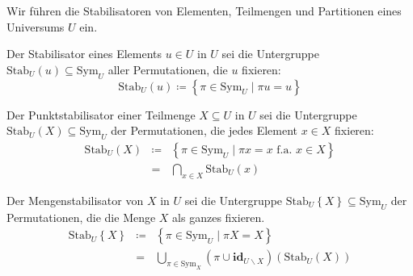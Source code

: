 Wir führen die Stabilisatoren von Elementen, Teilmengen und Partitionen
eines Universums $U$ ein.
\begin{defn}
Der Stabilisator eines Elements $u\in U$ in $U$ sei die Untergruppe
$\mathrm{Stab}_{U}\left(u\right)\subseteq\mathrm{Sym}_{U}$ aller
Permutationen, die $u$ fixieren: 
\[
\mathrm{Stab}_{U}\left(u\right)\coloneqq\left\{ \pi\in\mathrm{Sym}_{U}\mid\pi u=u\right\} 
\]

Der Punktstabilisator\textbf{ }einer Teilmenge $X\subseteq U$ in
$U$ sei die Untergruppe $\mathrm{Stab}_{U}\left(X\right)\subseteq\mathrm{Sym}_{U}$
der Permutationen, die jedes Element $x\in X$ fixieren:
\begin{eqnarray*}
\mathrm{Stab}_{U}\left(X\right) & \coloneqq & \left\{ \pi\in\mathrm{Sym}_{U}\mid\pi x=x\,\,\mathrm{f.a.}\,\,x\in X\right\} \\
 & = & \bigcap_{x\in X}\mathrm{Stab}_{U}\left(x\right)
\end{eqnarray*}

Der Mengenstabilisator von $X$ in $U$ sei die Untergruppe $\mathrm{Stab}_{U}\left\{ X\right\} \subseteq\mathrm{Sym}_{U}$
der Permutationen, die die Menge $X$ als ganzes fixieren.
\begin{eqnarray*}
\mathrm{Stab}_{U}\left\{ X\right\}  & \coloneqq & \left\{ \pi\in\mathrm{Sym}_{U}\mid\pi X=X\right\} \\
 & = & \bigcup_{\pi\in\mathrm{Sym}_{X}}\left(\pi\cup\mathbf{id}_{U\backslash X}\right)\left(\mathrm{Stab}_{U}\left(X\right)\right)
\end{eqnarray*}
\end{defn}
%
